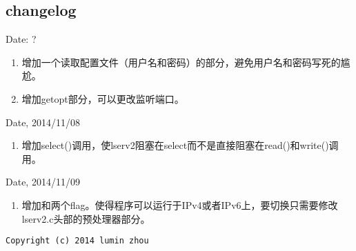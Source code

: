 \documentclass[a4paper,12pt]{article}
\begin{document}
\begin{CJK}{UTF8}{gbsn}
	\subsection{changelog}
		Date: ?
		\begin{enumerate}
		\item 增加一个读取配置文件（用户名和密码）的部分，避免用户名和密码写死的尴尬。
		\item 增加getopt部分，可以更改监听端口。
		\end{enumerate}
		Date, 2014/11/08
		\begin{enumerate}
		\item 增加select()调用，使lserv2阻塞在select而不是直接阻塞在read()和write()调用。
		\end{enumerate}
		Date, 2014/11/09
		\begin{enumerate}
		\item 增加和两个flag。使得程序可以运行于IPv4或者IPv6上，要切换只需要修改lserv2.c头部的预处理器部分。
		\end{enumerate}

	\begin{verbatim}
Copyright (c) 2014 lumin zhou
	\end{verbatim} 


\end{CJK}
\end{document}

